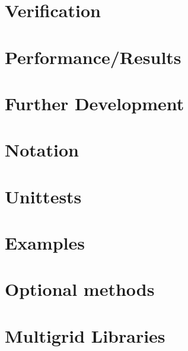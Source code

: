 \documentclass[x11names,twoside,english]{uiofysmaster}
\begin{document}
\chapter{Verification}
    
    
    
    
    
    

\chapter{Performance/Results}
    
    
    
    



%   
%
%   
%
\appendix
\chapter{Further Development}
    
%
\chapter{Notation}
    
%
\chapter{Unittests}
    
%
\chapter{Examples}
    
%
\chapter{Optional methods}
    
\chapter{Multigrid Libraries}
    

%     


%
\printbibliography
\end{document}
